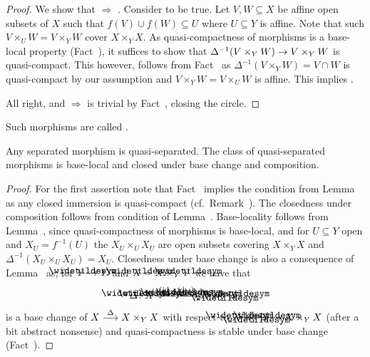 \documentclass[a4paper,parskip=half,numbers=enddot, DIV=12]{scrreprt}
\begin{document}
\begin{proof}
    We show that  $\Rightarrow$ . Consider  to be true. Let $V, W\subseteq X$ be affine open subsets of $X$ such that $f(V)\cup f(W) \subseteq U$ where $U\subseteq Y$ is affine. Note that such $V\times_U W = V\times_Y W$ cover $X\times_Y X$. As quasi-compactness of morphisms is a base-local property (Fact~), it suffices to show that $\Delta^{-1}(V\times_Y W)\morphism V\times_Y W$ is quasi-compact. This however, follows from Fact~ as $\Delta^{-1}(V\times_YW) = V\cap W$ is quasi-compact by our assumption and $V\times_Y W= V\times_U W$ is affine. This implies .
    
    All right, and  $\Rightarrow$  is trivial by Fact~, closing the circle.
\end{proof}
\begin{defi}
    Such morphisms are called .
\end{defi}
\begin{fact}
    Any separated morphism is quasi-separated. The class of quasi-separated morphisms is base-local and closed under base change and composition.
\end{fact}
\begin{proof}
    For the first assertion note that Fact~ implies the condition from Lemma~ as any closed immersion is quasi-compact (cf.\ Remark~). The closedness under composition follows from condition  of Lemma~. Base-locality follows from Lemma~, since quasi-compactness of morphisms is base-local, and for $U\subseteq Y$ open and $X_U = f^{-1}(U)$ the $X_U\times_U X_U$ are open subsets covering $X\times_Y X$ and $\Delta^{-1}(X_U\times_U X_U) = X_U$. Closedness under base change is also a consequence of Lemma~ as, for $\snake Y\morphism Y$ and $\snake X = X\times_Y \snake Y$ we have that 
    \begin{align*}
    	\snake\Delta\colon\snake X \xrightarrow{\left(\id_{\snake X},\id_{\snake X}\right)} \snake X\times_{\snake Y}\snake X\;
    \end{align*}
    is a base change of $X\morphism[\Delta] X\times_Y X$ with respect to $\snake X\times_{\snake Y} \snake X \morphism X\times_Y X$ (after a bit abstract nonsense) and quasi-compactness is stable under base change (Fact~).
\end{proof}
\end{document}
